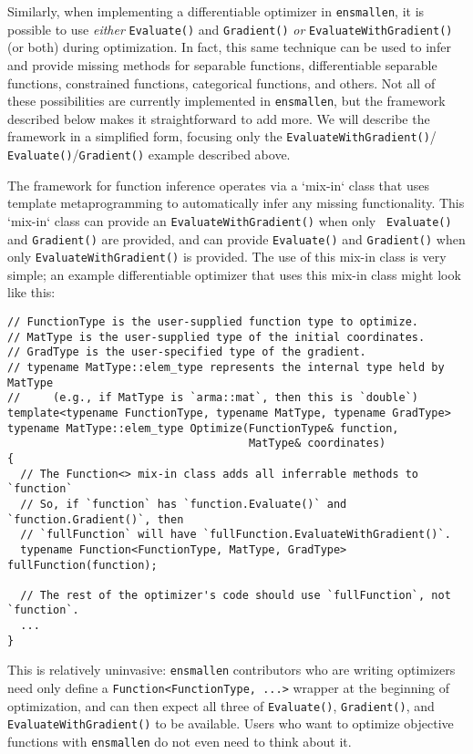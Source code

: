 Similarly, when implementing a differentiable optimizer in {\tt ensmallen}, it
is possible to use {\it either} {\tt Evaluate()} and {\tt Gradient()} {\it or}
{\tt EvaluateWithGradient()} (or both) during optimization.
In fact, this same technique can be used to infer and provide missing methods
for separable functions, differentiable separable functions, constrained
functions, categorical functions, and others.  Not all of these possibilities
are currently implemented in {\tt ensmallen}, but the framework described below
makes it straightforward to add more.  We will describe the framework in a
simplified form, focusing only the {\tt EvaluateWithGradient()}/{\tt
Evaluate()}/{\tt Gradient()} example described above.

The framework for function inference operates via a `mix-in` class that uses
template metaprogramming to automatically infer any missing functionality.  This
`mix-in` class can provide an {\tt EvaluateWithGradient()} when only {\tt
Evaluate()} and {\tt Gradient()} are provided, and can provide {\tt Evaluate()}
and {\tt Gradient()} when only {\tt EvaluateWithGradient()} is provided.  The
use of this mix-in class is very simple; an example differentiable optimizer
that uses this mix-in class might look like this:

\begin{verbatim}
// FunctionType is the user-supplied function type to optimize.
// MatType is the user-supplied type of the initial coordinates.
// GradType is the user-specified type of the gradient.
// typename MatType::elem_type represents the internal type held by MatType
//     (e.g., if MatType is `arma::mat`, then this is `double`)
template<typename FunctionType, typename MatType, typename GradType>
typename MatType::elem_type Optimize(FunctionType& function,
                                     MatType& coordinates)
{
  // The Function<> mix-in class adds all inferrable methods to `function`
  // So, if `function` has `function.Evaluate()` and `function.Gradient()`, then
  // `fullFunction` will have `fullFunction.EvaluateWithGradient()`.
  typename Function<FunctionType, MatType, GradType> fullFunction(function);

  // The rest of the optimizer's code should use `fullFunction`, not `function`.
  ...
}
\end{verbatim}

This is relatively uninvasive: {\tt ensmallen} contributors who are writing
optimizers need only define a {\tt Function<FunctionType, ...>} wrapper at the
beginning of optimization, and can then expect all three of {\tt Evaluate()},
{\tt Gradient()}, and {\tt EvaluateWithGradient()} to be available.  Users who
want to optimize objective functions with {\tt ensmallen} do not even need to
think about it.

